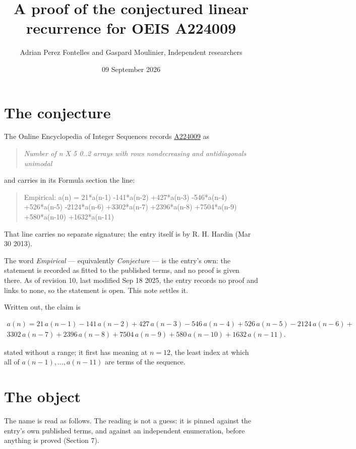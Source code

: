 \documentclass[11pt]{article}
\title{A proof of the conjectured linear recurrence for OEIS A224009}
\author{Adrian Perez Fontelles and Gaspard Moulinier, Independent researchers}
\date{09 September 2026}
\theoremstyle{definition}
\begin{document}
\maketitle
\section{The conjecture}

The Online Encyclopedia of Integer Sequences records \href{https://oeis.org/A224009}{A224009} as

\begin{quote}\itshape Number of n X 5 0..2 arrays with rows nondecreasing and antidiagonals unimodal\end{quote}

and carries in its Formula section the line:

\begin{quote}\ttfamily Empirical: a(n) = 21*a(n-1) -141*a(n-2) +427*a(n-3) -546*a(n-4) +526*a(n-5) -2124*a(n-6) +3302*a(n-7) +2396*a(n-8) +7504*a(n-9) +580*a(n-10) +1632*a(n-11)\end{quote}

That line carries no separate signature; the entry itself is by R. H. Hardin (Mar 30 2013).

The word {\itshape Empirical} --- equivalently {\itshape Conjecture} --- is the entry's own: the statement is recorded as fitted to the published terms, and no proof is given there. As of revision 10, last modified Sep 18 2025, the entry records no proof and links to none, so the statement is open. This note settles it.

Written out, the claim is

\begin{multline*} a(n) = 21\,a(n-1) - 141\,a(n-2) + 427\,a(n-3) - 546\,a(n-4) + 526\,a(n-5) - 2124\,a(n-6) + \\ 3302\,a(n-7) + 2396\,a(n-8) + 7504\,a(n-9) + 580\,a(n-10) + 1632\,a(n-11). \end{multline*}

stated without a range; it first has meaning at $n = 12$, the least index at which all of $a(n-1),\dots,a(n-11)$ are terms of the sequence.

\section{The object}

The name is read as follows. The reading is not a guess: it is pinned against the entry's own published terms, and against an independent enumeration, before anything is proved (Section 7).
\end{document}
